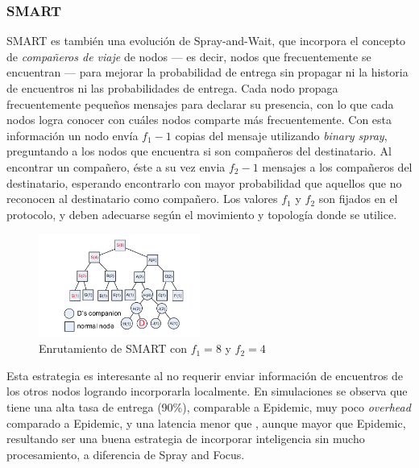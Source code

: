 \subsubsection{SMART}
SMART\cite{smart} es también una evolución de Spray-and-Wait, que incorpora el concepto de \emph{compañeros de viaje} de nodos --- es decir, nodos que frecuentemente se encuentran --- para mejorar la probabilidad de entrega sin propagar ni la historia de encuentros ni las probabilidades de entrega. Cada nodo propaga frecuentemente pequeños mensajes para declarar su presencia, con lo que cada nodos logra conocer con cuáles nodos comparte más frecuentemente. Con esta información un nodo envía $f_1-1$ copias del mensaje utilizando \emph{binary spray}, preguntando a los nodos que encuentra si son compañeros del destinatario. Al encontrar un compañero, éste a su vez envia $f_2-1$ mensajes a los compañeros del destinatario, esperando encontrarlo con mayor probabilidad que aquellos que no reconocen al destinatario como compañero. Los valores $f_1$ y $f_2$ son fijados en el protocolo, y deben adecuarse según el movimiento y topología donde se utilice.

\begin{figure}[h]
\centering
\includegraphics[width=200px]{smart.png}
\caption{Enrutamiento de SMART con $f_1 = 8$ y $f_2 = 4$ \cite{smart}}
\label{fig:smart}
\end{figure}

Esta estrategia es interesante al no requerir enviar información de encuentros de los otros nodos logrando incorporarla localmente. En simulaciones se observa que tiene una alta tasa de entrega (90\%), comparable a Epidemic, muy poco \emph{overhead} comparado a Epidemic, y una latencia menor que \cite{sandw}, aunque mayor que Epidemic, resultando ser una buena estrategia de incorporar inteligencia sin mucho procesamiento, a diferencia de Spray and Focus.